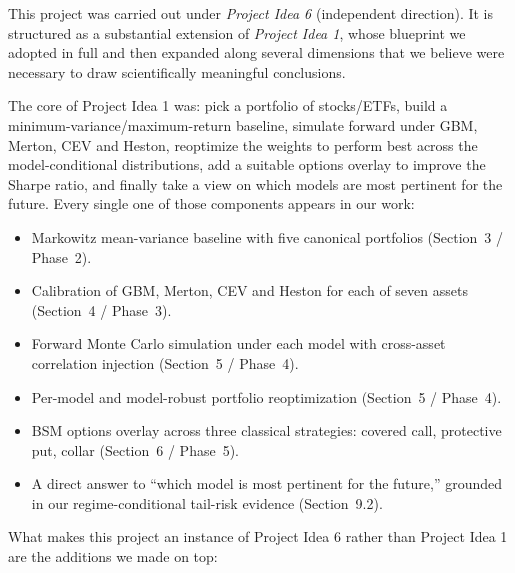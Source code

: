 \documentclass[11pt,letterpaper]{article}
\begin{document}
This project was carried out under \emph{Project Idea 6} (independent direction). It is structured as a substantial extension of \emph{Project Idea 1}, whose blueprint we adopted in full and then expanded along several dimensions that we believe were necessary to draw scientifically meaningful conclusions.

The core of Project Idea 1 was: pick a portfolio of stocks/ETFs, build a minimum-variance/maximum-return baseline, simulate forward under GBM, Merton, CEV and Heston, reoptimize the weights to perform best across the model-conditional distributions, add a suitable options overlay to improve the Sharpe ratio, and finally take a view on which models are most pertinent for the future. Every single one of those components appears in our work:

\begin{itemize}[leftmargin=*,nosep,topsep=4pt]
  \item Markowitz mean-variance baseline with five canonical portfolios (Section~3 / Phase~2).
  \item Calibration of GBM, Merton, CEV and Heston for each of seven assets (Section~4 / Phase~3).
  \item Forward Monte Carlo simulation under each model with cross-asset correlation injection (Section~5 / Phase~4).
  \item Per-model and model-robust portfolio reoptimization (Section~5 / Phase~4).
  \item BSM options overlay across three classical strategies: covered call, protective put, collar (Section~6 / Phase~5).
  \item A direct answer to ``which model is most pertinent for the future,'' grounded in our regime-conditional tail-risk evidence (Section~9.2).
\end{itemize}

What makes this project an instance of Project Idea 6 rather than Project Idea 1 are the additions we made on top:
\end{document}
